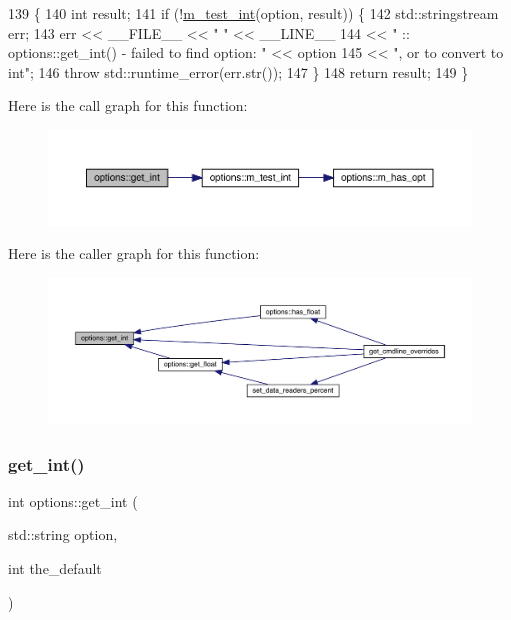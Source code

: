 \begin{DoxyCode}
139 \{
140   \textcolor{keywordtype}{int} result;
141   \textcolor{keywordflow}{if} (!\hyperlink{classoptions_ad9b4461e633b73acc2fde7752ef60d41}{m\_test\_int}(option, result)) \{
142     std::stringstream err;
143     err << \_\_FILE\_\_ << \textcolor{stringliteral}{" "} << \_\_LINE\_\_
144         << \textcolor{stringliteral}{" :: options::get\_int() - failed to find option: "} << option
145         << \textcolor{stringliteral}{", or to convert to int"};
146     \textcolor{keywordflow}{throw} std::runtime\_error(err.str());
147   \}
148   \textcolor{keywordflow}{return} result;
149 \}
\end{DoxyCode}
Here is the call graph for this function\+:\nopagebreak
\begin{figure}[H]
\begin{center}
\leavevmode
\includegraphics[width=350pt]{classoptions_a797bc1915004bdbc34c5eea3fe488952_cgraph}
\end{center}
\end{figure}
Here is the caller graph for this function\+:\nopagebreak
\begin{figure}[H]
\begin{center}
\leavevmode
\includegraphics[width=350pt]{classoptions_a797bc1915004bdbc34c5eea3fe488952_icgraph}
\end{center}
\end{figure}
\mbox{\label{classoptions_a0a17d018f4b64f85091f3ec21de029f0}} 
\subsubsection{\texorpdfstring{get\+\_\+int()}{get\_int()}\hspace{0.1cm}{\footnotesize\ttfamily [2/2]}}
{\footnotesize\ttfamily int options\+::get\+\_\+int (\begin{DoxyParamCaption}\item[{std\+::string}]{option,  }\item[{int}]{the\+\_\+default }\end{DoxyParamCaption})}

